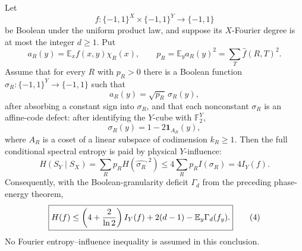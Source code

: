 \begin{theorem}
Let
\[
 f:\{-1,1\}^X\times\{-1,1\}^Y\longrightarrow\{-1,1\}
\]
be Boolean under the uniform product law, and suppose its $X$-Fourier
degree is at most the integer $d\geq1$.  Put
\[
 a_R(y)=\mathbb E_x f(x,y)\chi_R(x),\qquad
 p_R=\mathbb E_y a_R(y)^2=\sum_T\widehat f(R,T)^2.
\]
Assume that for every $R$ with $p_R>0$ there is a Boolean function
$\sigma_R:\{-1,1\}^Y\to\{-1,1\}$ such that
\[
 a_R(y)=\sqrt{p_R}\,\sigma_R(y),                                      \tag{1}
\]
after absorbing a constant sign into $\sigma_R$, and that each nonconstant
$\sigma_R$ is an affine-code defect: after identifying the $Y$-cube with
$\mathbb F_2^Y$,
\[
 \sigma_R(y)=1-2\mathbf 1_{A_R}(y),                                   \tag{2}
\]
where $A_R$ is a coset of a linear subspace of codimension $k_R\geq1$.
Then the full conditional spectral entropy is paid by physical
$Y$-influence:
\[
 H(S_Y\mid S_X)=\sum_Rp_R H(\widehat{\sigma_R}^{,2})
 \leq4\sum_Rp_R I(\sigma_R)=4I_Y(f).                                  \tag{3}
\]
Consequently, with the Boolean-granularity deficit $\Gamma_d$ from the
preceding phase-energy theorem,
\[
 \boxed{
 H(f)\leq\left(4+{2\over\ln2}\right)I_Y(f)+2(d-1)
          -\mathbb E_y\Gamma_d(f_y).}                                  \tag{4}
\]
No Fourier entropy--influence inequality is assumed in this conclusion.
\end{theorem}

